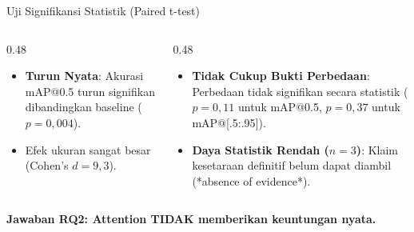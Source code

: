 \documentclass[aspectratio=169,10pt]{beamer}
\begin{document}
\begin{frame}{Uji Signifikansi Statistik (Paired t-test)}
    \begin{columns}[t]
        \begin{column}{0.48\textwidth}
            \centering
            \colorbox{accent!10}{}
            \vspace{0.8em}
            
            \small
            \begin{itemize}
                \item \textbf{Turun Nyata}: Akurasi mAP@0.5 turun signifikan dibandingkan baseline ($p = 0,004$).
                \item Efek ukuran sangat besar (Cohen's $d = 9,3$).
            \end{itemize}
        \end{column}
        
        \begin{column}{0.48\textwidth}
            \centering
            \colorbox{primary!10}{}
            \vspace{0.8em}
            
            \small
            \begin{itemize}
                \item \textbf{Tidak Cukup Bukti Perbedaan}: Perbedaan tidak signifikan secara statistik ($p = 0,11$ untuk mAP@0.5, $p = 0,37$ untuk mAP@[.5:.95]).
                \item \textbf{Daya Statistik Rendah ($n=3$)}: Klaim kesetaraan definitif belum dapat diambil (*absence of evidence*).
            \end{itemize}
        \end{column}
    \end{columns}
    
    \vspace{2.2em}
    \centering
    \large\textbf{\color{secondary}Jawaban RQ2: Attention TIDAK memberikan keuntungan nyata.}
\end{frame}
\end{document}
